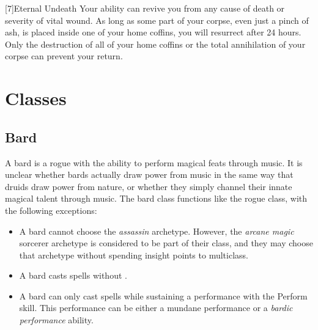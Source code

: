             [7]{Eternal Undeath} Your  ability can revive you from any cause of death or severity of vital wound.
            As long as some part of your corpse, even just a pinch of ash, is placed inside one of your home coffins, you will resurrect after 24 hours.
            Only the destruction of all of your home coffins or the total annihilation of your corpse can prevent your return.

\section{Classes}
    \subsection{Bard}
        A bard is a rogue with the ability to perform magical feats through music.
        It is unclear whether bards actually draw power from music in the same way that druids draw power from nature, or whether they simply channel their innate magical talent through music.
        The bard class functions like the rogue class, with the following exceptions:
        \begin{itemize}
            \item A bard cannot choose the \textit{assassin} archetype. However, the \textit{arcane magic} sorcerer archetype is considered to be part of their class, and they may choose that archetype without spending insight points to multiclass.
            \item A bard casts spells without .
            \item A bard can only cast spells while sustaining a performance with the Perform skill. This performance can be either a mundane performance or a \textit{bardic performance} ability.
        \end{itemize}

